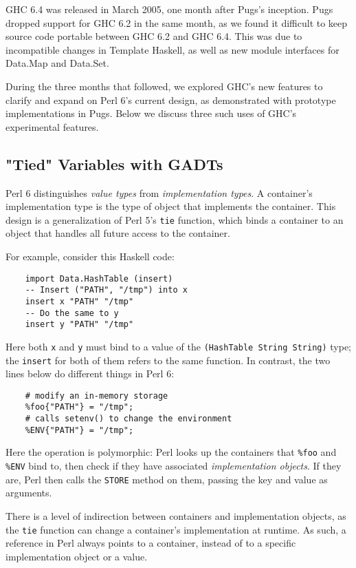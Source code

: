 \documentclass[]{sigplanconf}
\newcommand{\code}[1]{\texttt{#1}}
\begin{document}
GHC 6.4 was released in March 2005, one month after Pugs's inception.  Pugs
dropped support for GHC 6.2 in the same month, as we found it difficult to
keep source code portable between GHC 6.2 and GHC 6.4. This was due to
incompatible changes in Template Haskell, as well as new module interfaces
for Data.Map and Data.Set.

During the three months that followed, we explored GHC's new features to
clarify and expand on Perl 6's current design, as demonstrated with prototype
implementations in Pugs.  Below we discuss three such uses of GHC's
experimental features.

\subsection{"Tied" Variables with GADTs}
\label{sec:TiedVariableswithGADTs}

Perl 6 distinguishes \emph{value types} from \emph{implementation types}.  A
container's implementation type is the type of object that implements the
container.  This design is a generalization of Perl 5's \code{tie} function,
which binds a container to an object that handles all future access to the
container.

For example, consider this Haskell code:

\begin{lstlisting}
    import Data.HashTable (insert)
    -- Insert ("PATH", "/tmp") into x
    insert x "PATH" "/tmp"
    -- Do the same to y
    insert y "PATH" "/tmp"
\end{lstlisting}

Here both \code{x} and \code{y} must bind to a value of the \code{(HashTable
String String)} type; the \code{insert} for both of them refers to the same
function.  In contrast, the two lines below do different things in Perl 6:

\begin{lstlisting}
    # modify an in-memory storage
    %foo{"PATH"} = "/tmp";
    # calls setenv() to change the environment
    %ENV{"PATH"} = "/tmp";
\end{lstlisting}

Here the operation is polymorphic: Perl looks up the containers that
\code{\%foo} and \code{\%ENV} bind to, then check if they have associated
\emph{implementation objects}.  If they are, Perl then calls the \code{STORE}
method on them, passing the key and value as arguments.

There is a level of indirection between containers and implementation objects,
as the \code{tie} function can change a container's implementation at runtime.
As such, a reference in Perl always points to a container, instead of to a
specific implementation object or a value.
\end{document}
